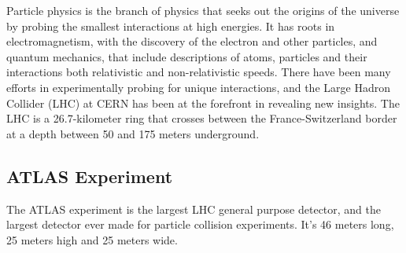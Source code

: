 Particle physics is the branch of physics that seeks out the origins of the universe by probing the smallest interactions at high energies.
It has roots in electromagnetism, with the discovery of the electron and other particles, and quantum mechanics, that include descriptions of atoms, particles and their interactions both relativistic and non-relativistic speeds. 
There have been many efforts in experimentally probing for unique interactions, and the Large Hadron Collider (LHC) at CERN has been at the forefront in revealing new insights.  
The LHC is a 26.7-kilometer ring that crosses between the France-Switzerland border at a depth between 50 and 175 meters underground. \cite{LHC_faq_guide}


\subsection{ATLAS Experiment}

The ATLAS experiment is the largest LHC general purpose detector, and the largest detector ever made for particle collision experiments. 
It's 46 meters long, 25 meters high and 25 meters wide. \cite{ATLAS_Fact_Sheet}